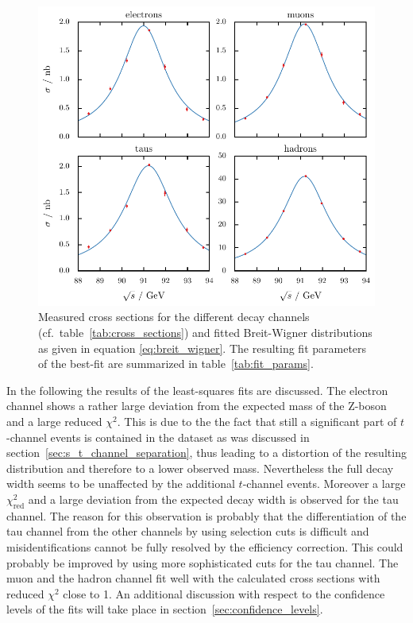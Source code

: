 \documentclass[11pt, a4paper]{article}
\numberwithin{equation}{section}
\begin{document}
\begin{figure}[tb]
	\centering
	\includegraphics{./figures/cross_sections.pdf}
	\caption{Measured cross sections for the different decay channels (cf.\ table~\ref{tab:cross_sections}) and fitted Breit-Wigner distributions as given in equation \eqref{eq:breit_wigner}. The resulting fit parameters of the best-fit are summarized in table~\ref{tab:fit_params}.}
	\label{fig:cross_section_fit}
\end{figure}

In the following the results of the least-squares fits are discussed.
The electron channel shows a rather large deviation from the expected mass of the Z-boson and a large reduced $\chi^2$.
This is due to the the fact that still a significant part of $t$-channel events is contained in the dataset as was discussed in section~\ref{sec:s_t_channel_separation}, thus leading to a distortion of the resulting distribution and therefore to a lower observed mass.
Nevertheless the full decay width seems to be unaffected by the additional $t$-channel events.
Moreover a large $\chi_\mathrm{red}^2$ and a large deviation from the expected decay width is observed for the tau channel.
The reason for this observation is probably that the differentiation of the tau channel from the other channels by using selection cuts is difficult and misidentifications cannot be fully resolved by the efficiency correction.
This could probably be improved by using more sophisticated cuts for the tau channel.
The muon and the hadron channel fit well with the calculated cross sections with reduced $\chi^2$ close to \num{1}.
An additional discussion with respect to the confidence levels of the fits will take place in section~\ref{sec:confidence_levels}.
\end{document}
